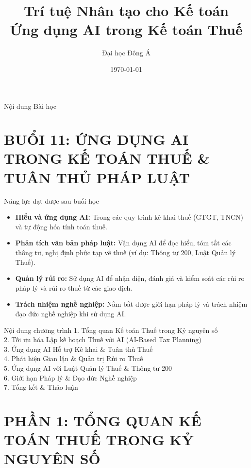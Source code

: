 \documentclass[aspectratio=169]{beamer}
\title[Buổi 11]{Trí tuệ Nhân tạo cho Kế toán \\ \vspace{0.3cm} \Large Ứng dụng AI trong Kế toán Thuế}
\author{Đại học Đông Á}
\date{\today}
\begin{document}
\begin{frame}
    \titlepage
\end{frame}

\begin{frame}{Nội dung Bài học}
    \tableofcontents
\end{frame}


\section{BUỔI 11: ỨNG DỤNG AI TRONG KẾ TOÁN THUẾ \& TUÂN THỦ PHÁP LUẬT}


\begin{frame}{Năng lực đạt được sau buổi học}
    \begin{itemize}
        \item \textbf{Hiểu và ứng dụng AI:} Trong các quy trình kê khai thuế (GTGT, TNCN) và tự động hóa tính toán thuế.
        \item \textbf{Phân tích văn bản pháp luật:} Vận dụng AI để đọc hiểu, tóm tắt các thông tư, nghị định phức tạp về thuế (ví dụ: Thông tư 200, Luật Quản lý Thuế).
        \item \textbf{Quản lý rủi ro:} Sử dụng AI để nhận diện, đánh giá và kiểm soát các rủi ro pháp lý và rủi ro thuế từ các giao dịch.
        \item \textbf{Trách nhiệm nghề nghiệp:} Nắm bắt được giới hạn pháp lý và trách nhiệm đạo đức nghề nghiệp khi sử dụng AI.
    \end{itemize}
\end{frame}


\begin{frame}{Nội dung chương trình}
    1. Tổng quan Kế toán Thuế trong Kỷ nguyên số\\
    2. Tối ưu hóa Lập kế hoạch Thuế với AI (AI-Based Tax Planning)\\
    3. Ứng dụng AI Hỗ trợ Kê khai \& Tuân thủ Thuế\\
    4. Phát hiện Gian lận \& Quản trị Rủi ro Thuế\\
    5. Ứng dụng AI với Luật Quản lý Thuế \& Thông tư 200\\
    6. Giới hạn Pháp lý \& Đạo đức Nghề nghiệp\\
    7. Tổng kết \& Thảo luận\\
\end{frame}


\section{PHẦN 1: TỔNG QUAN KẾ TOÁN THUẾ TRONG KỶ NGUYÊN SỐ}
\end{document}
